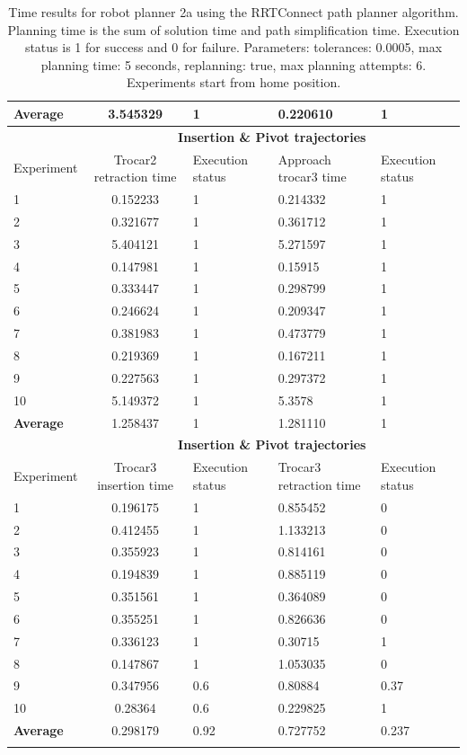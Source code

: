 \begin{longtable}{|p{2cm}|c|p{2cm}|p{2cm}|p{2cm}|}
\hline
\textbf{Average} & 3.545329	& 1	& 0.220610	& 1 \\
\hline
                          & \multicolumn{4}{c}{\textbf{Insertion \& Pivot trajectories}}                     \vline \\
\hline
Experiment                & Trocar2 retraction time & Execution status & Approach trocar3 time & Execution status  \\
\hline
1 & 0.152233	& 1	& 0.214332	& 1 \\
2 & 0.321677	& 1	& 0.361712	& 1 \\
3 & 5.404121	& 1	& 5.271597	& 1 \\
4 & 0.147981	& 1	& 0.15915	& 1 \\
5 & 0.333447	& 1	& 0.298799	& 1 \\
6 & 0.246624	& 1	& 0.209347	& 1 \\
7 & 0.381983	& 1	& 0.473779	& 1 \\
8 & 0.219369	& 1	& 0.167211	& 1 \\
9 & 0.227563	& 1	& 0.297372	& 1 \\
10  & 5.149372	& 1	& 5.3578	& 1 \\
\hline
\textbf{Average} & 1.258437	& 1	& 1.281110	& 1 \\
\hline
                          & \multicolumn{4}{c}{\textbf{Insertion \& Pivot trajectories}}                     \vline \\
\hline
Experiment                & Trocar3 insertion time & Execution status & Trocar3 retraction time & Execution status  \\
\hline
1 & 0.196175	& 1	& 0.855452	& 0 \\
2 & 0.412455	& 1	& 1.133213	& 0 \\
3 & 0.355923	& 1	& 0.814161	& 0 \\
4 & 0.194839	& 1	& 0.885119	& 0 \\
5 & 0.351561	& 1	& 0.364089	& 0 \\
6 & 0.355251	& 1	& 0.826636	& 0 \\
7 & 0.336123	& 1	& 0.30715	& 1 \\
8 & 0.147867	& 1	& 1.053035	& 0 \\
9 & 0.347956	& 0.6	& 0.80884	& 0.37  \\
10  & 0.28364	& 0.6	& 0.229825	& 1 \\
\hline
\textbf{Average} & 	0.298179	& 0.92 &	0.727752	& 0.237 \\
\hline

\caption{Time results for robot planner 2a using the RRTConnect path planner algorithm. Planning time is the sum of solution time and path simplification time. Execution status is 
1 for success and 0 for failure. Parameters: tolerances: 0.0005, max planning time: 5 seconds, replanning: true, max planning attempts: 6. Experiments start from home position.}
\label{robot-planner2a-rrtconnect-data}
\end{longtable}

